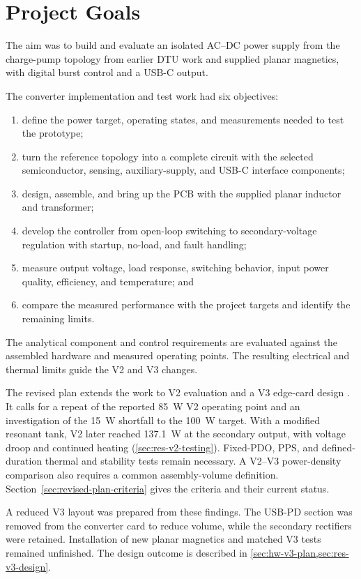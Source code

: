 \section{Project Goals}
\label{sec:intro-aim}

The aim was to build and evaluate an isolated AC--DC power supply from the charge-pump topology from earlier DTU work and supplied planar magnetics, with digital burst control and a USB-C output.

The converter implementation and test work had six objectives:
\begin{enumerate}[label=\arabic*)]
\item define the power target, operating states, and measurements needed to test the prototype;
\item turn the reference topology into a complete circuit with the selected semiconductor, sensing, auxiliary-supply, and USB-C interface components;
\item design, assemble, and bring up the PCB with the supplied planar inductor and transformer;
\item develop the controller from open-loop switching to secondary-voltage regulation with startup, no-load, and fault handling;
\item measure output voltage, load response, switching behavior, input power quality, efficiency, and temperature; and
\item compare the measured performance with the project targets and identify the remaining limits.
\end{enumerate}

The analytical component and control requirements are evaluated against the assembled hardware and measured operating points. The resulting electrical and thermal limits guide the V2 and V3 changes.

The revised plan extends the work to V2 evaluation and a V3 edge-card design \cite{projectOctoberPlan}. It calls for a repeat of the reported \SI{85}{\watt} V2 operating point and an investigation of the \SI{15}{\watt} shortfall to the \SI{100}{\watt} target. With a modified resonant tank, V2 later reached \SI{137.1}{\watt} at the secondary output, with voltage droop and continued heating (\cref{sec:res-v2-testing}). Fixed-PDO, PPS, and defined-duration thermal and stability tests remain necessary. A V2--V3 power-density comparison also requires a common assembly-volume definition. Section~\ref{sec:revised-plan-criteria} gives the criteria and their current status.

A reduced V3 layout was prepared from these findings. The USB-PD section was removed from the converter card to reduce volume, while the secondary rectifiers were retained. Installation of new planar magnetics and matched V3 tests remained unfinished. The design outcome is described in \cref{sec:hw-v3-plan,sec:res-v3-design}.
